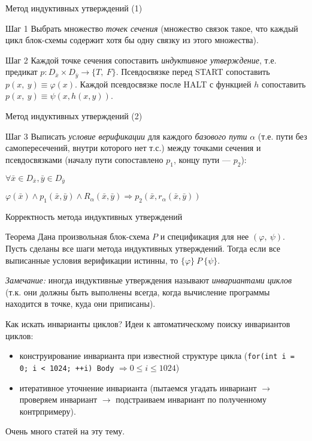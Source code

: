 \documentclass[hyperref={unicode=true}]{beamer}
\begin{document}
	\begin{frame}{Метод индуктивных утверждений (1)}
	\begin{block}{Шаг 1}
	Выбрать множество \emph{точек сечения} (множество связок такое, что каждый цикл блок-схемы содержит хотя бы одну связку из этого множества).
	\end{block}
	\begin{block}{Шаг 2}
	Каждой точке сечения сопоставить \emph{индуктивное утверждение}, т.е. предикат $p : D_{\bar{x}} \times D_{\bar{y}} \rightarrow \{T,~F\}$. Псевдосвязке перед START сопоставить $p(x,~y)\equiv\varphi(x)$. Каждой псевдосвязке после HALT с функцией $h$ сопоставить $p(x,~y)\equiv\psi(x,h(x,y))$.
	\end{block}
    \end{frame}
    \begin{frame}{Метод индуктивных утверждений (2)}
	\begin{block}{Шаг 3}
	Выписать \emph{условие верификации} для каждого \emph{базового пути} $\alpha$ (т.е. пути без самопересечений, внутри которого нет т.с.) между точками сечения и псевдосвязками (началу пути сопоставлено $p_1$, концу пути --- $p_2$):

    $\forall \bar{x} \in D_{\bar{x}},\bar{y} \in D_{\bar{y}}$

    $\varphi(\bar{x})\land p_1(\bar{x},\bar{y})\land R_{\alpha}(\bar{x},\bar{y}) \Rightarrow p_2(\bar{x},r_{\alpha}(\bar{x},\bar{y}))$
    \end{block}
	\end{frame}

	\begin{frame}{Корректность метода индуктивных утверждений}
	\begin{block}{Теорема}
		Дана произвольная блок-схема $P$ и спецификация для нее $(\varphi,~\psi)$. Пусть сделаны все шаги метода индуктивных утверждений. Тогда если все выписанные условия верификации истинны, то $\{\varphi\}~P~\{\psi\}$.
	\end{block}

	\emph{Замечание:} иногда индуктивные утверждения называют \emph{инвариантами циклов} (т.к. они должны быть выполнены всегда, когда вычисление программы находится в точке, куда они приписаны).
	\end{frame}

    \begin{frame}{Как искать инварианты циклов?}
    Идеи к автоматическому поиску инвариантов циклов:
    \begin{itemize}
    \item конструирование инварианта при известной структуре цикла (\texttt{for(int i = 0; i < 1024; ++i) Body} $\Rightarrow 0 \leq i \leq 1024$)
    \item итеративное уточнение инварианта (пытаемся угадать инвариант $\rightarrow$ проверяем инвариант $\rightarrow$ подстраиваем инвариант по полученному контрпримеру).
    \end{itemize}

    Очень много статей на эту тему.    
    \end{frame}
\end{document}
